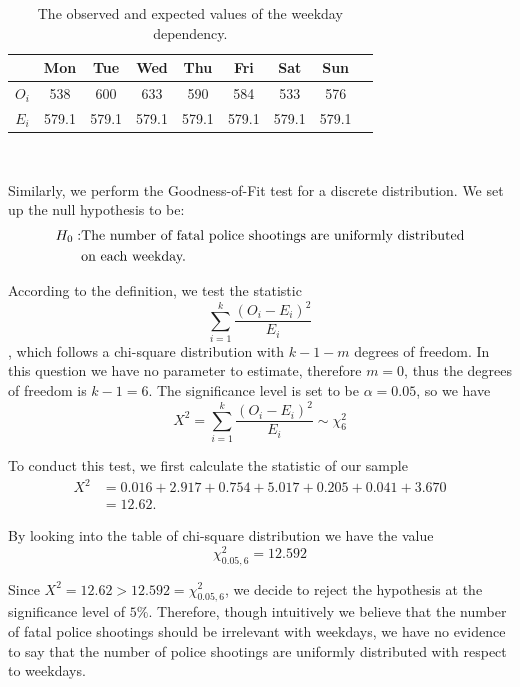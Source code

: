 \documentclass[a4paper]{article}
\begin{document}
{{\begin{table}[h]
\centering
    \begin{tabular}{c|cccccccc}
         \hline
         & Mon & Tue & Wed & Thu & Fri & Sat & Sun \\
         \hline
         \hline
         $O_i$ & 538 & 600 & 633 & 590 & 584 & 533  & 576\\
         $E_i$  & 579.1 & 579.1 & 579.1 & 579.1 & 579.1 & 579.1 & 579.1\\
         \hline
    \end{tabular}\\
    \caption{The observed and expected values of the weekday dependency.}
\end{table}
Similarly, we perform the Goodness-of-Fit test for a discrete distribution. We set up the null hypothesis to be:
   \begin{align*}
    \centering
    H_0: & \textrm{The number of fatal police shootings are uniformly distributed}
    \\& \textrm{on each weekday.}
    \end{align*}
\par{According to the definition, we test the statistic}
\[\sum_{i=1}^{k}\frac{(O_i-E_i)^2}{E_i}\]
, which follows a chi-square distribution with $k-1-m$ degrees of freedom. In this question we have no parameter to estimate, therefore $m = 0$, thus the degrees of freedom is $k-1=6$. The significance level is set to be $\alpha = 0.05$, so we have
\begin{equation}
    X^2 = \sum_{i=1}^{k}\frac{(O_i-E_i)^2}{E_i}\sim \chi_{6}^2
\end{equation}
\par{To conduct this test, we first calculate the statistic of our sample}
\begin{align*}
    X^2 &= 0.016 + 2.917 + 0.754 + 5.017 + 0.205 + 0.041 + 3.670\\
           &= 12.62.
\end{align*}
\par{By looking into the table of chi-square distribution we have the value}
\[\chi_{0.05,6}^2 = 12.592\]

Since $X^2 = 12.62>12.592 = \chi_{0.05,6}^2$, we decide to reject the hypothesis at the significance level of $5\%$. Therefore, though intuitively we believe that the number of fatal police shootings should be irrelevant with weekdays, we have no evidence to say that the number of police shootings are uniformly distributed with respect to weekdays.

}}
\end{document}
